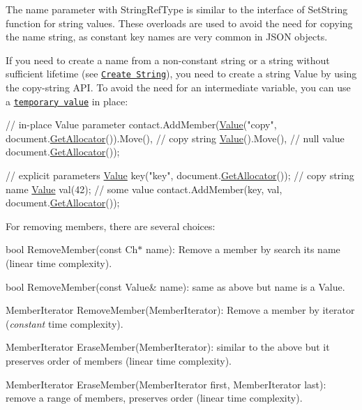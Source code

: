 The name parameter with {\ttfamily String\+Ref\+Type} is similar to the interface of {\ttfamily Set\+String} function for string values. These overloads are used to avoid the need for copying the {\ttfamily name} string, as constant key names are very common in J\+S\+ON objects.

If you need to create a name from a non-\/constant string or a string without sufficient lifetime (see \href{#CreateString}{\tt Create String}), you need to create a string Value by using the copy-\/string A\+PI. To avoid the need for an intermediate variable, you can use a \href{#TemporaryValues}{\tt temporary value} in place\+:


\begin{DoxyCode}
\textcolor{comment}{// in-place Value parameter}
contact.AddMember(\hyperlink{document_8h_a071cf97155ba72ac9a1fc4ad7e63d481}{Value}(\textcolor{stringliteral}{"copy"}, document.\hyperlink{class_generic_document_aa4609d6b19f86aec1a6b96edf2c27686}{GetAllocator}()).Move(), \textcolor{comment}{// copy string}
                  \hyperlink{document_8h_a071cf97155ba72ac9a1fc4ad7e63d481}{Value}().Move(),                                \textcolor{comment}{// null value}
                  document.\hyperlink{class_generic_document_aa4609d6b19f86aec1a6b96edf2c27686}{GetAllocator}());

\textcolor{comment}{// explicit parameters}
\hyperlink{class_generic_value}{Value} key(\textcolor{stringliteral}{"key"}, document.\hyperlink{class_generic_document_aa4609d6b19f86aec1a6b96edf2c27686}{GetAllocator}()); \textcolor{comment}{// copy string name}
\hyperlink{class_generic_value}{Value} val(42);                             \textcolor{comment}{// some value}
contact.AddMember(key, val, document.\hyperlink{class_generic_document_aa4609d6b19f86aec1a6b96edf2c27686}{GetAllocator}());
\end{DoxyCode}


For removing members, there are several choices\+:


\begin{DoxyItemize}
\item {\ttfamily bool Remove\+Member(const Ch$\ast$ name)}\+: Remove a member by search its name (linear time complexity).
\item {\ttfamily bool Remove\+Member(const Value\& name)}\+: same as above but {\ttfamily name} is a Value.
\item {\ttfamily Member\+Iterator Remove\+Member(\+Member\+Iterator)}\+: Remove a member by iterator ({\itshape constant} time complexity).
\item {\ttfamily Member\+Iterator Erase\+Member(\+Member\+Iterator)}\+: similar to the above but it preserves order of members (linear time complexity).
\item {\ttfamily Member\+Iterator Erase\+Member(\+Member\+Iterator first, Member\+Iterator last)}\+: remove a range of members, preserves order (linear time complexity).
\end{DoxyItemize}

